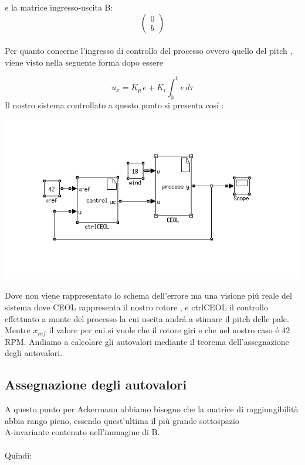 \documentclass[a4paper,13pt]{article}
\begin{document}
	e la matrice ingresso-uscita B:          %
\begin{equation*}
\begin{pmatrix}

	0\\b

\end{pmatrix}
\end{equation*} \\

Per quanto concerne l'ingresso di controllo del processo ovvero quello del pitch ,
viene visto nella seguente forma dopo essere

	
\begin{equation*}
	u_x=K_{p}\,e+K_{i}\int_{0}^{t} e \, d\tau              %
\end{equation*}	
Il nostro sistema controllato a questo punto si presenta cos\'i :

\begin{center}
\includegraphics[scale=0.6]{eolcont.png}
\end{center}

Dove non viene rappresentato lo schema dell'errore ma una visione pi\'u reale del sistema
dove CEOL rappresenta il nostro rotore , e ctrlCEOL il controllo effettuato a monte del processo la cui uscita andr\'a a stimare il pitch delle pale.\\
Mentre $x_{ref}$ il valore per cui si vuole che il rotore giri e che nel nostro caso \'e 42 RPM.
Andiamo a calcolare gli autovalori mediante il teorema dell'assegnazione degli autovalori.
\subsection{Assegnazione degli autovalori}
A questo punto per Ackermann abbiamo bisogno che la matrice di raggiungibilità abbia rango pieno, essendo quest'ultima 	il più grande sottospazio \\A-invariante contenuto nell'immagine di B.\\ \\
	Quindi:
	
\end{document}
